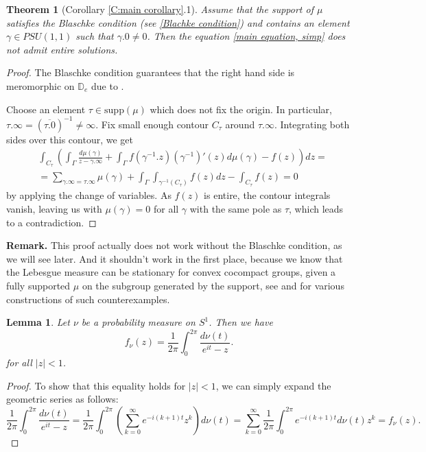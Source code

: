\documentclass[11pt]{article}
\newtheorem{theorem}{Theorem}[section]
\newtheorem{lemma}{Lemma}[section]
\begin{document}
\begin{theorem}[Corollary \ref{C:main corollary}.1]
	\label{entire solutions}
	Assume that the support of $\mu$ satisfies the Blaschke condition (see \eqref{Blachke condition}) and contains an element \\ $\gamma \in PSU(1,1)$ such that $\gamma.0 \ne 0$. Then the equation \eqref{main equation, simp} does not admit entire solutions.
\end{theorem}
\begin{proof}
	The Blaschke condition guarantees that the right hand side is meromorphic on $\mathbb{D}_e$ due to \cite[Proposition 4.2.14]{Shapiro1968}.
	
	Choose an element $\tau \in \text{supp}(\mu)$ which does not fix the origin. In particular, $\tau.\infty = (\overline{\tau.0})^{-1} \ne \infty$. Fix small enough contour $C_\tau$ around $\tau.\infty$. Integrating both sides over this contour, we get
	\[
	\begin{aligned}
		& \int_{C_\tau}\left( \int_\Gamma \frac{d\mu(\gamma)}{z - \gamma.\infty}  + \int_\Gamma f(\gamma^{-1}.z)(\gamma^{-1})'(z)  d\mu(\gamma) - f(z) \right) dz = \\ 
		&= \sum_{\gamma.\infty = \tau.\infty} \mu(\gamma) + \int_\Gamma \int_{\gamma^{-1}(C_\tau)} f(z) dz - \int_{C_\tau} f(z)  = 0
	\end{aligned}
	\]
	by applying the change of variables. As $f(z)$ is entire, the contour integrals vanish, leaving us with $\mu(\gamma) = 0$ for all $\gamma$ with the same pole as $\tau$, which leads to a contradiction.
\end{proof}

\textbf{Remark.} This proof actually does not work without the Blaschke condition, as we will see later. And it shouldn't work in the first place, because we know that the Lebesgue measure can be stationary for convex cocompact groups, given a fully supported $\mu$ on the subgroup generated by the support, see \cite{furstenberg71} and \cite{10.1215/00127094-2020-0058} for various constructions of such counterexamples.


\begin{lemma}
	\label{T:Cauchy transform}
	Let $\nu$ be a probability measure on $S^1$. Then we have
	\begin{equation}
		\label{E:Cauchy transform}
		f_\nu(z) = \frac{1}{2 \pi} \int_0^{2 \pi} \dfrac{d \nu(t)}{e^{i t} - z}.
	\end{equation}
	for all $|z| < 1$.
\end{lemma}
\begin{proof}
	To show that this equality holds for $|z| < 1$, we can simply expand the geometric series as follows:
	\[
	\frac{1}{2 \pi} \int_0^{2 \pi} \dfrac{d \nu(t)}{e^{i t} - z} = \frac{1}{2 \pi} \int_0^{2 \pi} \left( \sum_{k=0}^\infty e^{-i (k+1) t} z^k \right)  d\nu(t) = \sum_{k=0}^\infty \frac{1}{2 \pi} \int_0^{2 \pi} e^{-i (k+1) t} d \nu(t) z^k = f_\nu(z).
	\]
\end{proof}
\end{document}
